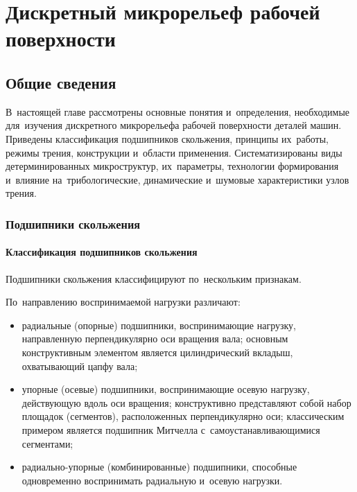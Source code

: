 \chapter{Дискретный микрорельеф рабочей поверхности}

\section{Общие сведения}

В~настоящей главе рассмотрены основные понятия и~определения, необходимые для~изучения дискретного микрорельефа рабочей поверхности деталей машин. Приведены классификация подшипников скольжения, принципы их~работы, режимы трения, конструкции и~области применения. Систематизированы виды детерминированных микроструктур, их~параметры, технологии формирования и~влияние на~трибологические, динамические и~шумовые характеристики узлов трения.

\subsection{Подшипники скольжения}

\subsubsection{Классификация подшипников скольжения}

Подшипники скольжения классифицируют по~нескольким признакам.

По~направлению воспринимаемой нагрузки различают:
\begin{itemize}
\item радиальные (опорные) подшипники, воспринимающие нагрузку, направленную перпендикулярно оси вращения вала; основным конструктивным элементом является цилиндрический вкладыш, охватывающий цапфу вала;
\item упорные (осевые) подшипники, воспринимающие осевую нагрузку, действующую вдоль оси вращения; конструктивно представляют собой набор площадок (сегментов), расположенных перпендикулярно оси; классическим примером является подшипник Митчелла с~самоустанавливающимися сегментами;
\item радиально-упорные (комбинированные) подшипники, способные одновременно воспринимать радиальную и~осевую нагрузки.
\end{itemize}

